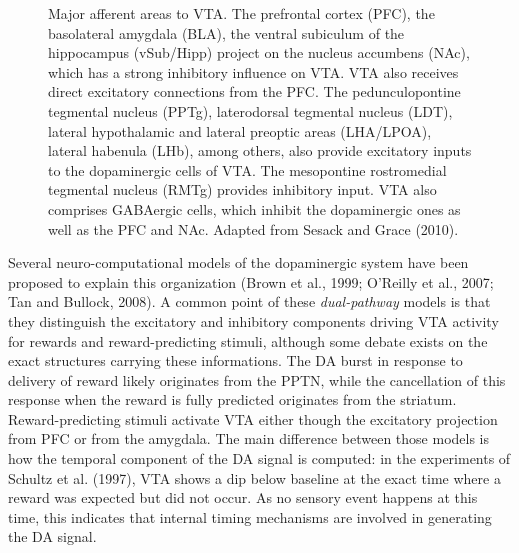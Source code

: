 \documentclass[
  11pt,
  a4paper,
]{scrbook}
\begin{document}
\begin{figure}


\caption{\label{fig-intro:vta_afferents}Major afferent areas to VTA. The
prefrontal cortex (PFC), the basolateral amygdala (BLA), the ventral
subiculum of the hippocampus (vSub/Hipp) project on the nucleus
accumbens (NAc), which has a strong inhibitory influence on VTA. VTA
also receives direct excitatory connections from the PFC. The
pedunculopontine tegmental nucleus (PPTg), laterodorsal tegmental
nucleus (LDT), lateral hypothalamic and lateral preoptic areas
(LHA/LPOA), lateral habenula (LHb), among others, also provide
excitatory inputs to the dopaminergic cells of VTA. The mesopontine
rostromedial tegmental nucleus (RMTg) provides inhibitory input. VTA
also comprises GABAergic cells, which inhibit the dopaminergic ones as
well as the PFC and NAc. Adapted from Sesack and Grace (2010).}

\end{figure}%

Several neuro-computational models of the dopaminergic system have been
proposed to explain this organization (Brown et al., 1999; O'Reilly et
al., 2007; Tan and Bullock, 2008). A common point of these
\emph{dual-pathway} models is that they distinguish the excitatory and
inhibitory components driving VTA activity for rewards and
reward-predicting stimuli, although some debate exists on the exact
structures carrying these informations. The DA burst in response to
delivery of reward likely originates from the PPTN, while the
cancellation of this response when the reward is fully predicted
originates from the striatum. Reward-predicting stimuli activate VTA
either though the excitatory projection from PFC or from the amygdala.
The main difference between those models is how the temporal component
of the DA signal is computed: in the experiments of Schultz et al.
(1997), VTA shows a dip below baseline at the exact time where a reward
was expected but did not occur. As no sensory event happens at this
time, this indicates that internal timing mechanisms are involved in
generating the DA signal.
\end{document}
